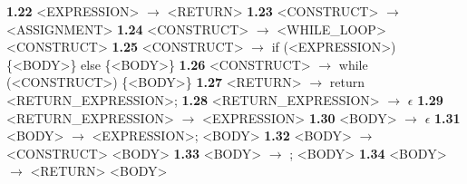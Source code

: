 \documentclass{article}
\begin{document}
\textbf{1.22} <EXPRESSION> $\rightarrow$ <RETURN> \newline
\textbf{1.23} <CONSTRUCT> $\rightarrow$ <ASSIGNMENT> \newline
\textbf{1.24} <CONSTRUCT> $\rightarrow$ <WHILE\_LOOP> <CONSTRUCT> \newline
\textbf{1.25} <CONSTRUCT> $\rightarrow$ if (<EXPRESSION>) \{<BODY>\} else \{<BODY>\} \newline
\textbf{1.26} <CONSTRUCT> $\rightarrow$ while (<CONSTRUCT>) \{<BODY>\} \newline
\textbf{1.27} <RETURN> $\rightarrow$ return <RETURN\_EXPRESSION>; \newline
\textbf{1.28} <RETURN\_EXPRESSION> $\rightarrow$ $\epsilon$ \newline
\textbf{1.29} <RETURN\_EXPRESSION> $\rightarrow$ <EXPRESSION> \newline
\textbf{1.30} <BODY> $\rightarrow$ $\epsilon$ \newline
\textbf{1.31} <BODY> $\rightarrow$ <EXPRESSION>; <BODY> \newline
\textbf{1.32} <BODY> $\rightarrow$ <CONSTRUCT> <BODY> \newline
\textbf{1.33} <BODY> $\rightarrow$ ; <BODY> \newline
\textbf{1.34} <BODY> $\rightarrow$ <RETURN> <BODY> \newline
\end{document}
